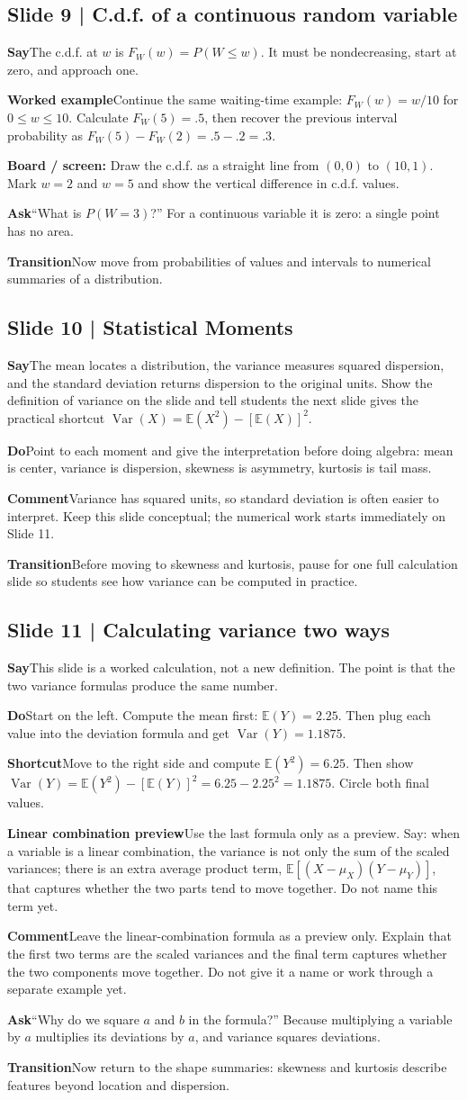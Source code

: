 \documentclass[11pt,a4paper]{article}
\newcommand{\slideheading}[1]{\subsection*{\color{accent}#1}}
\newcommand{\cue}[2]{\par\noindent\textbf{#1}\quad #2\par}
\newcommand{\board}[1]{\par\noindent\colorbox{soft}{\parbox{0.96\textwidth}{\textbf{Board / screen:} #1}}\par}
\newcommand{\E}{\mathbb{E}}
\newcommand{\Var}{\operatorname{Var}}
\begin{document}
\slideheading{Slide 9 | C.d.f. of a continuous random variable}
\cue{Say}{The c.d.f. at $w$ is $F_W(w)=P(W\leq w)$. It must be nondecreasing, start at zero, and approach one.}
\cue{Worked example}{Continue the same waiting-time example: $F_W(w)=w/10$ for $0\leq w\leq10$. Calculate $F_W(5)=.5$, then recover the previous interval probability as $F_W(5)-F_W(2)=.5-.2=.3$.}
\board{Draw the c.d.f. as a straight line from $(0,0)$ to $(10,1)$. Mark $w=2$ and $w=5$ and show the vertical difference in c.d.f. values.}
\cue{Ask}{``What is $P(W=3)$?'' For a continuous variable it is zero: a single point has no area.}
\cue{Transition}{Now move from probabilities of values and intervals to numerical summaries of a distribution.}

\slideheading{Slide 10 | Statistical Moments}
\cue{Say}{The mean locates a distribution, the variance measures squared dispersion, and the standard deviation returns dispersion to the original units. Show the definition of variance on the slide and tell students the next slide gives the practical shortcut $\Var(X)=\E(X^2)-[\E(X)]^2$.}
\cue{Do}{Point to each moment and give the interpretation before doing algebra: mean is center, variance is dispersion, skewness is asymmetry, kurtosis is tail mass.}
\cue{Comment}{Variance has squared units, so standard deviation is often easier to interpret. Keep this slide conceptual; the numerical work starts immediately on Slide 11.}
\cue{Transition}{Before moving to skewness and kurtosis, pause for one full calculation slide so students see how variance can be computed in practice.}

\slideheading{Slide 11 | Calculating variance two ways}
\cue{Say}{This slide is a worked calculation, not a new definition. The point is that the two variance formulas produce the same number.}
\cue{Do}{Start on the left. Compute the mean first: $\E(Y)=2.25$. Then plug each value into the deviation formula and get $\Var(Y)=1.1875$.}
\cue{Shortcut}{Move to the right side and compute $\E(Y^2)=6.25$. Then show $\Var(Y)=\E(Y^2)-[\E(Y)]^2=6.25-2.25^2=1.1875$. Circle both final values.}
\cue{Linear combination preview}{Use the last formula only as a preview. Say: when a variable is a linear combination, the variance is not only the sum of the scaled variances; there is an extra average product term, $\E[(X-\mu_X)(Y-\mu_Y)]$, that captures whether the two parts tend to move together. Do not name this term yet.}
\cue{Comment}{Leave the linear-combination formula as a preview only. Explain that the first two terms are the scaled variances and the final term captures whether the two components move together. Do not give it a name or work through a separate example yet.}
\cue{Ask}{``Why do we square $a$ and $b$ in the formula?'' Because multiplying a variable by $a$ multiplies its deviations by $a$, and variance squares deviations.}
\cue{Transition}{Now return to the shape summaries: skewness and kurtosis describe features beyond location and dispersion.}
\end{document}
